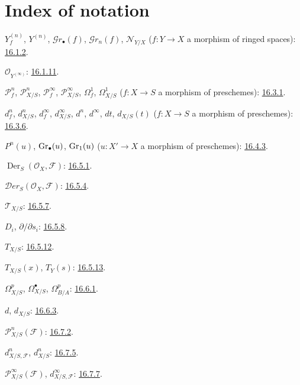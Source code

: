 \clearpage
{}
{}
\section*{Index of notation}

\begingroup
\small
\setlength{\parindent}{0pt}
\setlength{\parskip}{1.5pt}
\newcommand{\EGAIVidxref}[1]{\hyperref[IV.#1]{#1}}

$Y_f^{(n)}$, $Y^{(n)}$, $\mathcal{G}r_{\bullet}(f)$,
$\mathcal{G}r_n(f)$, $\mathcal{N}_{Y/X}$
($f:Y\to X$ a morphism of ringed spaces): {\hyperref[section:IV.16]{16.1.2}}.

$\mathcal{O}_{Y^{(\infty)}}$: {\hyperref[section:IV.16]{16.1.11}}.

$\mathcal{P}^{n}_{f}$, $\mathcal{P}^{n}_{X/S}$,
$\mathcal{P}^{\infty}_{f}$, $\mathcal{P}^{\infty}_{X/S}$,
$\Omega^{1}_{f}$, $\Omega^{1}_{X/S}$
($f:X\to S$ a morphism of preschemes): {\hyperref[section:IV.16]{16.3.1}}.

$d^{n}_{f}$, $d^{n}_{X/S}$, $d^{\infty}_{f}$,
$d^{\infty}_{X/S}$, $d^{n}$, $d^{\infty}$, $dt$, $d_{X/S}(t)$
($f:X\to S$ a morphism of preschemes): {\hyperref[section:IV.16]{16.3.6}}.

$P^{n}(u)$, $\operatorname{Gr}_{\bullet}(u)$, $\operatorname{Gr}_{1}(u)$
($u:X'\to X$ a morphism of preschemes): {\hyperref[IV.16.4.3]{16.4.3}}.

$\operatorname{Der}_{S}(\mathcal{O}_{X},\mathcal{F})$:
{\hyperref[section:IV.16]{16.5.1}}.

$\mathcal{D}er_{S}(\mathcal{O}_{X},\mathcal{F})$:
{\hyperref[section:IV.16]{16.5.4}}.

$\mathcal{T}_{X/S}$: {\hyperref[section:IV.16]{16.5.7}}.

$D_i$, $\partial/\partial s_i$: {\hyperref[IV.16.5.8]{16.5.8}}.

$T_{X/S}$: {\hyperref[section:IV.16]{16.5.12}}.

$T_{X/S}(x)$, $T_Y(s)$: {\hyperref[section:IV.16]{16.5.13}}.

$\Omega^p_{X/S}$, $\Omega^\bullet_{X/S}$, $\Omega^p_{B/A}$:
{\hyperref[section:IV.16]{16.6.1}}.

$d$, $d_{X/S}$: {\hyperref[section:IV.16]{16.6.3}}.

$\mathcal{P}^n_{X/S}(\mathcal{F})$: {\hyperref[IV.16.7.2]{16.7.2}}.

$d^n_{X/S,\mathcal{F}}$, $d^n_{X/S}$: {\hyperref[IV.16.7.5]{16.7.5}}.

$\mathcal{P}^{\infty}_{X/S}(\mathcal{F})$,
$d^{\infty}_{X/S,\mathcal{F}}$: {\hyperref[IV.16.7.7]{16.7.7}}.

